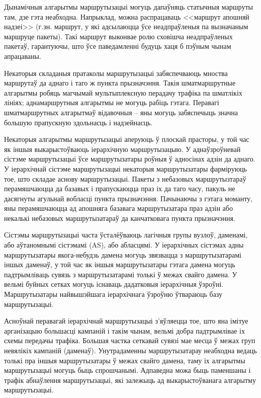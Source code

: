 Дынамічныя алгарытмы маршрутызацыі могуць дапаўняць статычныя маршруты там, дзе гэта неабходна. Напрыклад, можна распрацаваць <<маршрут апошняй надзеі>> (г.зн. маршрут, у які адсылаюцца ўсе неадпраўленыя па вызначаным маршруце пакеты). Такі маршрут выконвае ролю сховішча неадпраўленых 
пакетаў, гарантуючы, што ўсе паведамленні будуць хаця б пэўным чынам апрацаваны.

Некаторыя складаныя пратаколы маршрутызацыі забяспечваюць мноства маршрутаў да аднаго і таго ж пункта прызначэння. Такія шматмаршрутные алгарытмы робяць магчымай мультыплексную перадачу трафіка па шматлікіх лініях; аднамаршрутныя алгарытмы не могуць рабіць гэтага.
Перавагі шматмаршрутных алгарытмаў відавочныя -- яны могуць забяспечыць значна большую прапускную здольнасць і надзейнасць.

Некаторыя алгарытмы маршрутызацыі аперуюць ў плоскай
прасторы, у той час як іншыя выкарыстоўваюць іерархічную маршрутызацыю. У аднаўзроўневай сістэме маршрутызацыі ўсе маршрутызатары роўныя ў адносінах адзін да аднаго. У іерархічнай сістэме маршрутызацыі некаторыя маршрутызатары фарміруюць тое, што складае аснову маршрутызацыі.
Пакеты з небазовых маршрутызтараў перамяшчаюцца да базавых і прапускаюцца праз іх да таго часу, пакуль не дасягнуты агульнай вобласці пункта прызначэння. Пачынаючы з гэтага моманту, яны перамяшчаюцца ад апошняга базавага маршрутызатара праз адзін або некалькі небазовых маршрутызатараў да канчатковага пункта прызначэння.

Сістэмы маршрутызацыі часта ўсталёўваюць лагічныя групы вузлоў, даменамі, або аўтаномнымі сістэмамі (AS), або абласцямі. У іерархічных сістэмах адны маршрутызатары якога-небудзь дамена могуць звязвацца з маршрутызатарамі іншых даменаў, у той час як іншыя маршрутызатары гэтага дамена могуць падтрымліваць сувязь з маршрутызатарамі толькі ў межах свайго дамена. У вельмі буйных сетках могуць існаваць дадатковыя іерархічныя ўзроўні. Маршрутызатары найвышэйшага іерархічнага ўзроўню ўтвараюць базу маршрутызацыі.

Асноўнай перавагай іерархічнай маршрутызацыі з'яўляецца тое, што яна імітуе арганізацыю большасці кампаній і такім чынам, вельмі добра падтрымлівае іх схемы передачы трафіка. Большая частка сеткавай сувязі мае месца ў межах груп невялікіх кампаній (даменаў). Унутрадаменны маршрутызатарау неабходна ведаць толькі пра іншыя маршрутызатары ў межах свайго дамена, таму іх алгарытмы маршрутызацыі могуць быць спрошчанымі. Адпаведна можа быць паменшаны і трафік абнаўлення маршрутызацыі, які залежыць ад выкарыстоўванага алгарытму маршрутызацыі.

